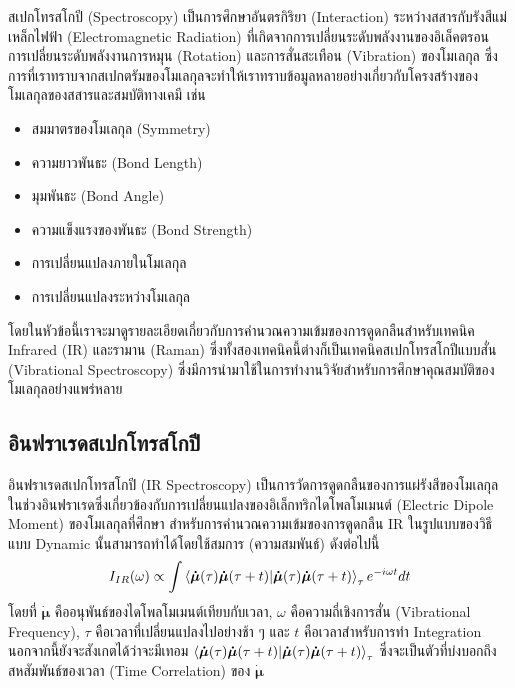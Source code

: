 สเปกโทรสโกปี (Spectroscopy) เป็นการศึกษาอันตรกิริยา (Interaction) ระหว่างสสารกับรังสีแม่เหล็กไฟฟ้า (Electromagnetic Radiation) ที่เกิดจากการเปลี่ยนระดับพลังงานของอิเล็คตรอน การเปลี่ยนระดับพลังงานการหมุน (Rotation) และการสั่นสะเทือน (Vibration) ของโมเลกุล ซึ่งการที่เราทราบจากสเปกตรัมของโมเลกุลจะทำให้เราทราบข้อมูลหลายอย่างเกี่ยวกับโครงสร้างของโมเลกุลของสสารและสมบัติทางเคมี เช่น
%
\begin{itemize}[topsep=0pt,noitemsep]\setlength\itemsep{0.5em}
    \item สมมาตรของโมเลกุล (Symmetry)

    \item ความยาวพันธะ (Bond Length)

    \item มุมพันธะ (Bond Angle)

    \item ความแข็งแรงของพันธะ (Bond Strength)

    \item การเปลี่ยนแปลงภายในโมเลกุล

    \item การเปลี่ยนแปลงระหว่างโมเลกุล
\end{itemize}

โดยในหัวข้อนี้เราจะมาดูรายละเอียดเกี่ยวกับการคำนวณความเข้มของการดูดกลืนสำหรับเทคนิค Infrared (IR) และรามาน (Raman) ซึ่งทั้งสองเทคนิคนี้ต่างก็เป็นเทคนิคสเปกโทรสโกปีแบบสั่น (Vibrational Spectroscopy) ซึ่งมีการนำมาใช้ในการทำงานวิจัยสำหรับการศึกษาคุณสมบัติของโมเลกุลอย่างแพร่หลาย

\subsection{อินฟราเรดสเปกโทรสโกปี}
\label{ssec:ir_spectro}

อินฟราเรดสเปกโทรสโกปี (IR Spectroscopy) เป็นการวัดการดูดกลืนของการแผ่รังสีของโมเลกุลในช่วงอินฟราเรดซึ่งเกี่ยวข้องกับการเปลี่ยนแปลงของอิเล็กทริกไดโพลโมเมนต์ (Electric Dipole Moment) ของโมเลกุลที่ศึกษา สำหรับการคำนวณความเข้มของการดูดกลืน IR ในรูปแบบของวิธีแบบ Dynamic นั้นสามารถทำได้โดยใช้สมการ (ความสมพันธ์) ดังต่อไปนี้\autocite{thomas2013}
%
\begin{equation}\label{eq:IR_corr}
    I_{IR} (\omega) \propto \int \braket{\bm{\dot{\mu}}(\tau) \bm{\dot{\mu}}(\tau+t)}_{\tau} e^{-i \omega t} dt
\end{equation}
%
\noindent โดยที่ $\bm{\dot{\mu}}$ คืออนุพันธ์ของไดโพลโมเมนต์เทียบกับเวลา, $\omega$ คือความถี่เชิงการสั่น (Vibrational Frequency), $\tau$ คือเวลาที่เปลี่ยนแปลงไปอย่างช้า ๆ และ $t$ คือเวลาสำหรับการทำ Integration นอกจากนี้ยังจะสังเกตได้ว่าจะมีเทอม $\braket{\bm{\dot{\mu}}(\tau) \bm{\dot{\mu}}(\tau+t)}_{\tau}$ ซึ่งจะเป็นตัวที่บ่งบอกถึงสหสัมพันธ์ของเวลา (Time Correlation) ของ $\bm{\dot{\mu}}$

